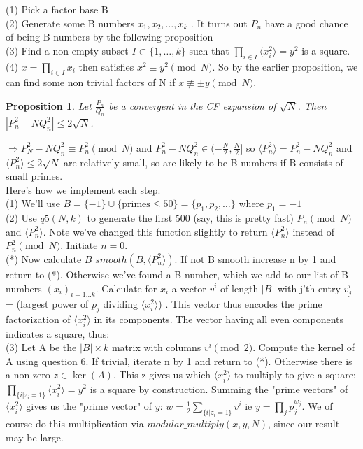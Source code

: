 \documentclass[10pt,a4paper]{report}
\newtheorem*{prop}{Proposition}
\begin{document}
(1) Pick a factor base B\\
(2) Generate some B numbers $x_1, x_2, \dots, x_k$ . It turns out $P_n$ have a good chance of being B-numbers by the following proposition\\
(3) Find a non-empty subset $I\subset\{1, \dots ,k\}$ such that $\prod_{i\in I}\langle x_i^2 \rangle=y^2$ is a square.\\
(4) $x=\prod_{i\in I}x_i$ then satisfies $x^2\equiv y^2 \pmod N$. So by the earlier proposition, we can find some non trivial factors of N if $x\not\equiv \pm y \pmod N$. \\

\begin{prop}
Let $\frac{P_n}{Q_n}$ be a convergent in the CF expansion of $\sqrt{N}$. Then $|P_n^2-NQ_n^2|\leq2\sqrt{N}$.
\end{prop}

$\Rightarrow P_N^2-NQ_n^2 \equiv P_n^2 \pmod N$ and $P_n^2-NQ_n^2 \in (-\frac{N}{2}, \frac{N}{2}]$ so $\langle P_n^2\rangle = P_n^2-NQ_n^2$ and $\langle P_n^2\rangle\leq2\sqrt{N}$ are relatively small, so are likely to be B numbers if B consists of small primes.\\

Here's how we implement each step.\\

(1) We'll use $B= \{-1\} \cup \{\text{primes}\leq 50\}  = \{p_1, p_2, \dots\}$ where $p_1=-1$\\

(2) Use $q5(N,k)$ to generate the first 500 (say, this is pretty fast) $P_n \pmod N$ and $\langle P_n^2 \rangle$. Note we've changed this function slightly to return 
 $\langle P_n^2 \rangle$ instead of $P_n^2 \pmod N$. Initiate $n=0$.\\

(*) Now calculate $B\_smooth(B, \langle P_n^2 \rangle)$. If not B smooth increase n by 1 and return to (*). Otherwise we've found a B number, which we add to our list of B numbers $(x_i)_{i=1\dots k}$. Calculate for $x_i$ a vector  $v^{i}$ of length $|B|$ with j'th entry $v^{i}_j$= (largest power of $p_j$ dividing $\langle x_i^2 \rangle$) . This vector thus encodes the prime factorization of $\langle x_i^2 \rangle$ in its components. The vector having all even components indicates a square, thus:\\
 
(3) Let A be the $|B|\times k$ matrix with columns $v^{i} \pmod 2$. Compute the kernel of A using question 6. If trivial, iterate n by 1 and return to (*). Otherwise there is a non zero $z \in \ker{(A)}$. This z gives us which $\langle x_i^2 \rangle$ to multiply to give a square:  $\prod_{\{i | z_i = 1\}} \langle x_i^2 \rangle = y^2$ is a square by construction. Summing the "prime vectors" of $\langle x_i^2 \rangle$ gives us  the "prime vector" of $y$:   $w=\frac{1}{2}\sum_{\{i | z_i = 1\}}v^i$ ie $y=\prod_{j}p_j^{w_j}$. We of course do this multiplication via $modular\_multiply(x,y,N)$, since our result may be large. \\
\end{document}
